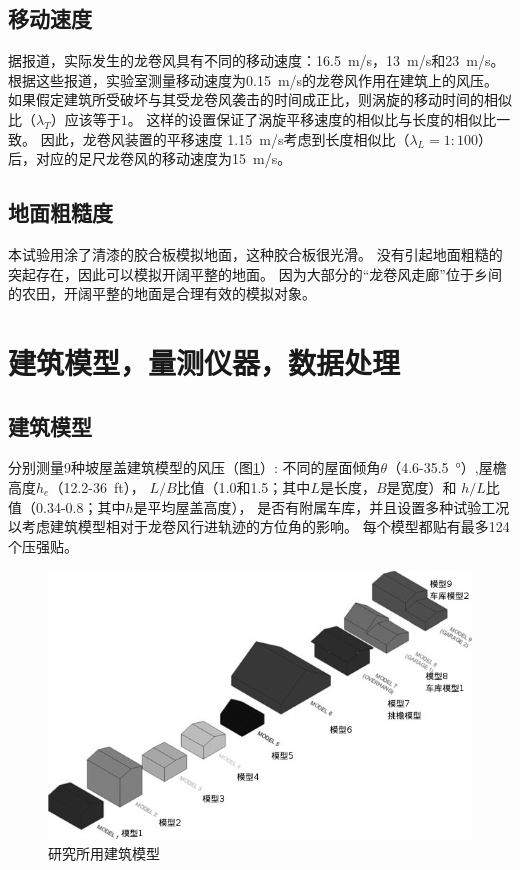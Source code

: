 \documentclass{ctexart}
\begin{document}
\subsection{移动速度}
据报道，实际发生的龙卷风具有不同的移动速度：\SI{16.5}{m/s}\cite{thampi2011finite}，\SI{13}{m/s}\cite{lee2005diagnosed}和\SI{23}{m/s}\cite{haan2008design}。
根据这些报道，实验室测量移动速度为\SI{0.15}{m/s}的龙卷风作用在建筑上的风压。
如果假定建筑所受破坏与其受龙卷风袭击的时间成正比，则涡旋的移动时间的相似比（$\lambda_T$）应该等于$1$。
这样的设置保证了涡旋平移速度的相似比与长度的相似比一致。
因此，龙卷风装置的平移速度 \SI{1.15}{m/s}考虑到长度相似比（$\lambda_L=1:100$）后，对应的足尺龙卷风的移动速度为\SI{15}{m/s}。

\subsection{地面粗糙度}
本试验用涂了清漆的胶合板模拟地面，这种胶合板很光滑。
没有引起地面粗糙的突起存在，因此可以模拟开阔平整的地面。
因为大部分的“龙卷风走廊”位于乡间的农田，开阔平整的地面是合理有效的模拟对象。

\section{建筑模型，量测仪器，数据处理}
\subsection{建筑模型}
分别测量9种坡屋盖建筑模型的风压（图\ref{fig:building-models}）:
不同的屋面倾角$\theta$（\num{4.6}-\SI{35.5}{\degree}）,屋檐高度$h_e$（\num{12.2}-\SI{36}{ft}），
$L/B$比值（\num{1.0}和\num{1.5}；其中$L$是长度，$B$是宽度）和
$h/L$比值（\num{0.34}-\num{0.8}；其中$h$是平均屋盖高度），
是否有附属车库，并且设置多种试验工况以考虑建筑模型相对于龙卷风行进轨迹的方位角的影响。
每个模型都贴有最多\num{124}个压强贴。

\begin{figure}
\centering
\includegraphics{./fig/2}
\caption{研究所用建筑模型}
\label{fig:building-models}
\end{figure}
\end{document}
